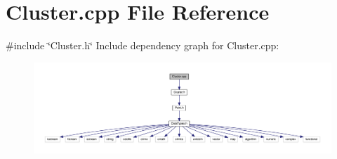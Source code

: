 \section{Cluster.\+cpp File Reference}
\label{_cluster_8cpp}
{\ttfamily \#include \char`\"{}Cluster.\+h\char`\"{}}\newline
Include dependency graph for Cluster.\+cpp\+:
\nopagebreak
\begin{figure}[H]
\begin{center}
\leavevmode
\includegraphics[width=350pt]{_cluster_8cpp__incl}
\end{center}
\end{figure}
